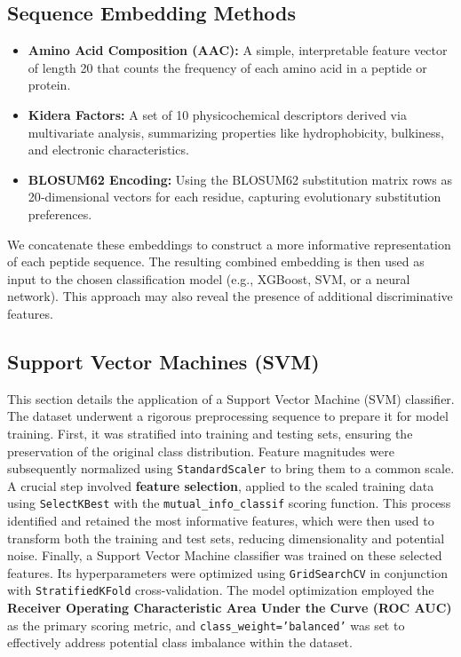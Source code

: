 \documentclass{article}
\begin{document}
\subsection{Sequence Embedding Methods}
\begin{itemize}
    \item \textbf{Amino Acid Composition (AAC):} A simple, interpretable feature vector of length 20 that counts the frequency of each amino acid in a peptide or protein.
    \item \textbf{Kidera Factors:} A set of 10 physicochemical descriptors derived via multivariate analysis, summarizing properties like hydrophobicity, bulkiness, and electronic characteristics.
    \item \textbf{BLOSUM62 Encoding:} Using the BLOSUM62 substitution matrix rows as 20‑dimensional vectors for each residue, capturing evolutionary substitution preferences.
\end{itemize}

We concatenate these embeddings to construct a more informative representation of each peptide sequence. The resulting combined embedding is then used as input to the chosen classification model (e.g., XGBoost, SVM, or a neural network). This approach may also reveal the presence of additional discriminative features.

\subsection{Support Vector Machines (SVM)}
This section details the application of a Support Vector Machine (SVM) classifier. The dataset underwent a rigorous preprocessing sequence to prepare it for model training. First, it was stratified into training and testing sets, ensuring the preservation of the original class distribution. Feature magnitudes were subsequently normalized using \texttt{StandardScaler} to bring them to a common scale. A crucial step involved \textbf{feature selection}, applied to the scaled training data using \texttt{SelectKBest} with the \texttt{mutual\_info\_classif} scoring function. This process identified and retained the most informative features, which were then used to transform both the training and test sets, reducing dimensionality and potential noise. Finally, a Support Vector Machine classifier was trained on these selected features. Its hyperparameters were optimized using \texttt{GridSearchCV} in conjunction with \texttt{StratifiedKFold} cross-validation. The model optimization employed the \textbf{Receiver Operating Characteristic Area Under the Curve (ROC AUC)} as the primary scoring metric, and \texttt{class\_weight='balanced'} was set to effectively address potential class imbalance within the dataset.
\end{document}
